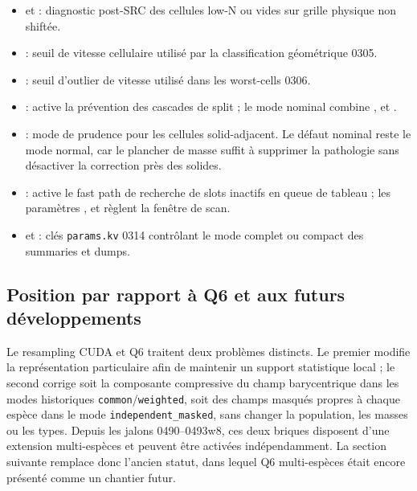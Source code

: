 \documentclass[11pt,a4paper]{article}
\begin{document}
\begin{itemize}[nosep]
  \item {} et  : diagnostic post-SRC des cellules low-N ou vides sur grille physique non shiftée.
  \item {} : seuil de vitesse cellulaire utilisé par la classification géométrique 0305.
  \item {} : seuil d'outlier de vitesse utilisé dans les worst-cells 0306.
  \item {} : active la prévention des cascades de split ; le mode nominal combine ,  et .
  \item {} : mode de prudence pour les cellules solid-adjacent. Le défaut nominal reste le mode normal, car le plancher de masse suffit à supprimer la pathologie sans désactiver la correction près des solides.
  \item {} : active le fast path de recherche de slots inactifs en queue de tableau ; les paramètres ,  et  règlent la fenêtre de scan.
  \item {} et  : clés \texttt{params.kv} 0314 contrôlant le mode complet ou compact des summaries et dumps.
\end{itemize}

\subsection{Position par rapport à Q6 et aux futurs développements}

Le resampling CUDA et Q6 traitent deux problèmes distincts. Le premier modifie la représentation particulaire afin de maintenir un support statistique local ; le second corrige soit la composante compressive du champ barycentrique dans les modes historiques \texttt{common}/\texttt{weighted}, soit des champs masqués propres à chaque espèce dans le mode \texttt{independent\_masked}, sans changer la population, les masses ou les types. Depuis les jalons 0490--0493w8, ces deux briques disposent d'une extension multi-espèces et peuvent être activées indépendamment. La section suivante remplace donc l'ancien statut, dans lequel Q6 multi-espèces était encore présenté comme un chantier futur.
\end{document}
